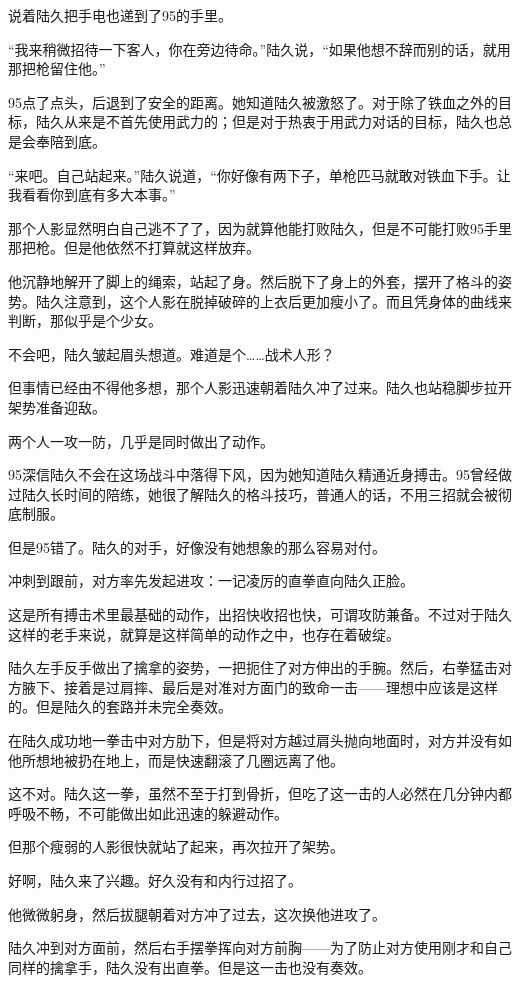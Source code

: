 说着陆久把手电也递到了95的手里。

“我来稍微招待一下客人，你在旁边待命。”陆久说，“如果他想不辞而别的话，就用那把枪留住他。”

95点了点头，后退到了安全的距离。她知道陆久被激怒了。对于除了铁血之外的目标，陆久从来是不首先使用武力的；但是对于热衷于用武力对话的目标，陆久也总是会奉陪到底。

“来吧。自己站起来。”陆久说道，“你好像有两下子，单枪匹马就敢对铁血下手。让我看看你到底有多大本事。”

那个人影显然明白自己逃不了了，因为就算他能打败陆久，但是不可能打败95手里那把枪。但是他依然不打算就这样放弃。

他沉静地解开了脚上的绳索，站起了身。然后脱下了身上的外套，摆开了格斗的姿势。陆久注意到，这个人影在脱掉破碎的上衣后更加瘦小了。而且凭身体的曲线来判断，那似乎是个少女。

不会吧，陆久皱起眉头想道。难道是个……战术人形？

但事情已经由不得他多想，那个人影迅速朝着陆久冲了过来。陆久也站稳脚步拉开架势准备迎敌。

两个人一攻一防，几乎是同时做出了动作。

95深信陆久不会在这场战斗中落得下风，因为她知道陆久精通近身搏击。95曾经做过陆久长时间的陪练，她很了解陆久的格斗技巧，普通人的话，不用三招就会被彻底制服。

但是95错了。陆久的对手，好像没有她想象的那么容易对付。

冲刺到跟前，对方率先发起进攻：一记凌厉的直拳直向陆久正脸。

这是所有搏击术里最基础的动作，出招快收招也快，可谓攻防兼备。不过对于陆久这样的老手来说，就算是这样简单的动作之中，也存在着破绽。

陆久左手反手做出了擒拿的姿势，一把扼住了对方伸出的手腕。然后，右拳猛击对方腋下、接着是过肩摔、最后是对准对方面门的致命一击——理想中应该是这样的。但是陆久的套路并未完全奏效。

在陆久成功地一拳击中对方肋下，但是将对方越过肩头抛向地面时，对方并没有如他所想地被扔在地上，而是快速翻滚了几圈远离了他。

这不对。陆久这一拳，虽然不至于打到骨折，但吃了这一击的人必然在几分钟内都呼吸不畅，不可能做出如此迅速的躲避动作。

但那个瘦弱的人影很快就站了起来，再次拉开了架势。

好啊，陆久来了兴趣。好久没有和内行过招了。

他微微躬身，然后拔腿朝着对方冲了过去，这次换他进攻了。

陆久冲到对方面前，然后右手摆拳挥向对方前胸——为了防止对方使用刚才和自己同样的擒拿手，陆久没有出直拳。但是这一击也没有奏效。


